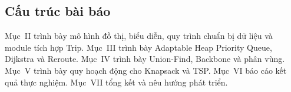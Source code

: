 \subsection{Cấu trúc bài báo}

Mục~II trình bày mô hình đồ thị, biểu diễn, quy trình chuẩn bị dữ liệu và module tích hợp Trip. Mục~III trình bày Adaptable Heap Priority Queue, Dijkstra và Reroute. Mục~IV trình bày Union-Find, Backbone và phân vùng. Mục~V trình bày quy hoạch động cho Knapsack và TSP. Mục~VI báo cáo kết quả thực nghiệm. Mục~VII tổng kết và nêu hướng phát triển.
